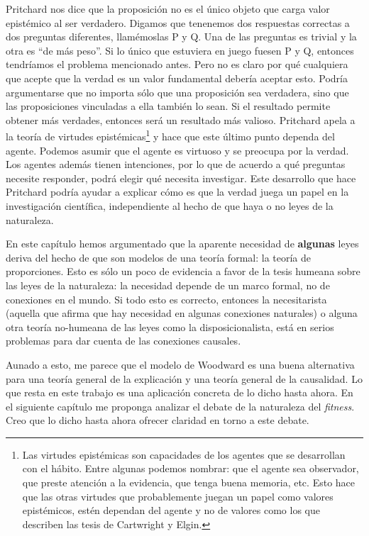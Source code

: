 Pritchard nos dice que la proposición no es el único objeto que carga valor epistémico al ser verdadero. Digamos que tenenemos dos respuestas correctas a dos preguntas diferentes, llamémoslas P y Q. Una de las preguntas es trivial y la otra es ``de más peso''. Si lo único que estuviera en juego fuesen P y Q, entonces tendríamos el problema mencionado antes. Pero no es claro por qué cualquiera que acepte que la verdad es un valor fundamental debería aceptar esto. Podría argumentarse que no importa sólo que una proposición sea verdadera, sino que las proposiciones vinculadas a ella también lo sean. Si el resultado permite obtener más verdades, entonces será un resultado más valioso. Pritchard apela a la teoría de virtudes epistémicas\footnote{Las virtudes epistémicas son capacidades de los agentes que se desarrollan con el hábito. Entre algunas podemos nombrar: que el agente sea observador, que preste atención a la evidencia, que tenga buena memoria, etc. Esto hace que las otras virtudes que probablemente juegan un papel como valores epistémicos, estén dependan del agente y no de valores como los que describen las tesis de Cartwright y Elgin.} y hace que este último punto dependa del agente. Podemos asumir que el agente es virtuoso y se preocupa por la verdad. Los agentes además tienen intenciones, por lo que de acuerdo a qué preguntas necesite responder, podrá elegir qué necesita investigar. Este desarrollo que hace Pritchard podría ayudar a explicar cómo es que la verdad juega un papel en la investigación científica, independiente al hecho de que haya o no leyes de la naturaleza.

En este capítulo hemos argumentado que la aparente necesidad de \textbf{algunas} leyes deriva del hecho de que son modelos de una teoría formal: la teoría de proporciones. Esto es sólo un poco de evidencia a favor de la tesis humeana sobre las leyes de la naturaleza: la necesidad depende de un marco formal, no de conexiones en el mundo. Si todo esto es correcto, entonces la necesitarista  (aquella que afirma que hay necesidad en algunas conexiones naturales) o alguna otra teoría no-humeana de las leyes como la disposicionalista, está en serios problemas para dar cuenta de las conexiones causales.

Aunado a esto, me parece que el modelo de Woodward es una buena alternativa para una teoría general de la explicación y una teoría general de la causalidad. Lo que resta en este trabajo es una aplicación concreta de lo dicho hasta ahora. En el siguiente capítulo me proponga analizar el debate de la naturaleza del \emph{fitness}. Creo que lo dicho hasta ahora ofrecer claridad en torno a este debate.

